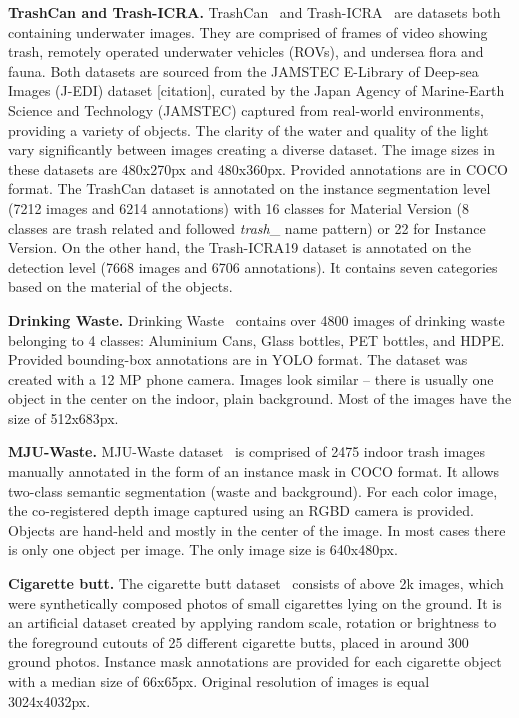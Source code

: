 \documentclass{article}
\begin{document}
\textbf{TrashCan and Trash-ICRA.} TrashCan~\cite{hong2020trashcan} and Trash-ICRA~\cite{ICRA2019} are datasets both containing underwater images. They are comprised of frames of video showing trash, remotely operated underwater vehicles (ROVs), and undersea flora and fauna. Both datasets are sourced from the JAMSTEC E-Library of Deep-sea Images (J-EDI) dataset [citation], curated by the Japan Agency of Marine-Earth Science and Technology (JAMSTEC) captured from real-world environments, providing a variety of objects. The clarity of the water and quality of the light vary significantly between images creating a diverse dataset. The image sizes in these datasets are 480x270px and 480x360px. Provided annotations are in COCO format. The TrashCan dataset is annotated on the instance segmentation level (7212 images and 6214 annotations) with 16 classes for Material Version (8 classes are trash related and followed \textit{trash}\_ name pattern) or 22 for Instance Version. On the other hand, the Trash-ICRA19 dataset is annotated on the detection level (7668 images and 6706 annotations). It contains seven categories based on the material of the objects.

\textbf{Drinking Waste.} Drinking Waste~\cite{drinking_waste_classification2020} contains over 4800 images of drinking waste belonging to 4 classes: Aluminium Cans, Glass bottles, PET bottles, and HDPE. Provided bounding-box annotations are in YOLO format. The dataset was created with a 12 MP phone camera. Images look similar -- there is usually one object in the center on the indoor, plain background. Most of the images have the size of 512x683px.

\textbf{MJU-Waste.} MJU-Waste dataset~\cite{MJU-Waste2020} is comprised of 2475 indoor trash images manually annotated in the form of an instance mask in COCO format. It allows two-class semantic segmentation (waste and background). For each color image, the co-registered depth image captured using an RGBD camera is provided. Objects are hand-held and mostly in the center of the image. In most cases there is only one object per image. The only image size is 640x480px.

\textbf{Cigarette butt.} The cigarette butt dataset~\cite{cigarette-butts} consists of above 2k images, which were synthetically composed photos of small cigarettes lying on the ground. It is an artificial dataset created by applying random scale, rotation or brightness to the foreground cutouts of 25 different cigarette butts, placed in around 300 ground photos. Instance mask annotations are provided for each cigarette object with a median size of 66x65px. Original resolution of images is equal 3024x4032px.
\end{document}
